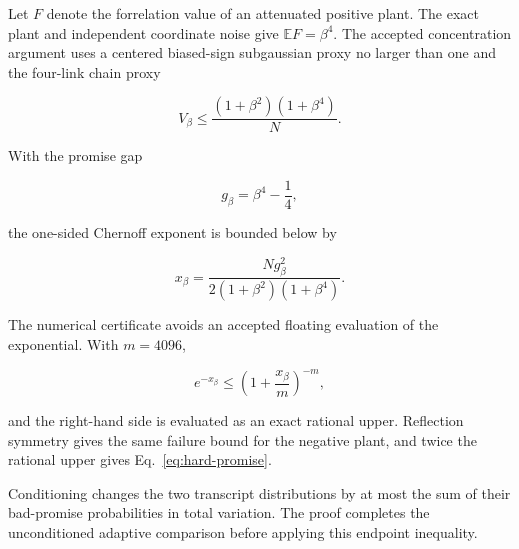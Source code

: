 Let $F$ denote the forrelation value of an attenuated positive plant. The exact plant and independent coordinate noise give $\mathbb E F=\beta^4$. The accepted concentration argument uses a centered biased-sign subgaussian proxy no larger than one and the four-link chain proxy

\begin{equation}
V_\beta
\le\frac{(1+\beta^2)(1+\beta^4)}{N}.
\end{equation}

With the promise gap

\begin{equation}
g_\beta=\beta^4-\frac14,
\end{equation}

the one-sided Chernoff exponent is bounded below by

\begin{equation}
x_\beta
=\frac{Ng_\beta^2}{2(1+\beta^2)(1+\beta^4)}.
\end{equation}

The numerical certificate avoids an accepted floating evaluation of the exponential. With $m=4096$,

\begin{equation}
e^{-x_\beta}
\le\left(1+\frac{x_\beta}{m}\right)^{-m},
\end{equation}

and the right-hand side is evaluated as an exact rational upper. Reflection symmetry gives the same failure bound for the negative plant, and twice the rational upper gives Eq.~\eqref{eq:hard-promise}.

Conditioning changes the two transcript distributions by at most the sum of their bad-promise probabilities in total variation. The proof completes the unconditioned adaptive comparison before applying this endpoint inequality.
